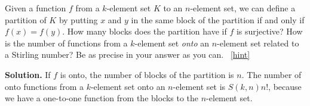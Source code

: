 \documentclass{book}
\begin{document}
\setcounter{project}{203}
\addtocounter{project}{-1}
\begin{activity}[]\label{activity-196}
\hypertarget{p-1149}{}%
Given a function \(f\) from a \(k\)-element set \(K\) to an \(n\)-element set, we can define a partition of \(K\) by putting \(x\) and \(y\) in the same block of the partition if and only if \(f(x)=f(y)\). How many blocks does the partition have if \(f\) is surjective? How is the number of functions from a \(k\)-element set \emph{onto} an \(n\)-element set related to a Stirling number? Be as precise in your answer as you can.%
~\hfill{\tiny\hyperlink{a-203}{[hint]}\hypertarget{q-203}{}}\par\smallskip%
\noindent\textbf{Solution.}\hypertarget{solution-118}{}\quad%
\hypertarget{p-1151}{}%
If \(f\) is onto, the number of blocks of the partition is \(n\). The number of onto functions from a \(k\)-element set onto an \(n\)-element set is \(S(k,n)n!\), because we have a one-to-one function from the blocks to the \(n\)-element set.%
\end{activity}
\end{document}
